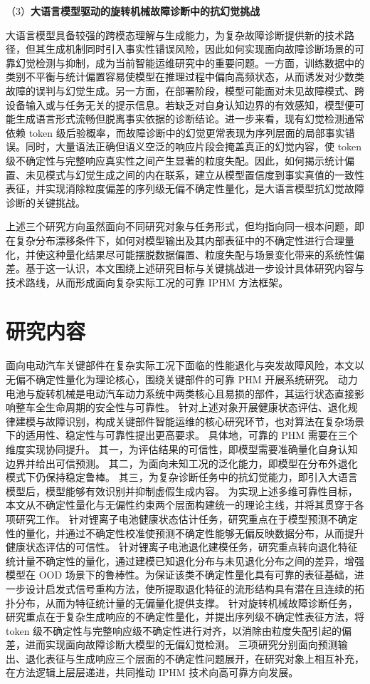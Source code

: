 （3）\textbf{大语言模型驱动的旋转机械故障诊断中的抗幻觉挑战}

大语言模型具备较强的跨模态理解与生成能力，为复杂故障诊断提供新的技术路径，但其生成机制同时引入事实性错误风险，因此如何实现面向故障诊断场景的可靠幻觉检测与抑制，成为当前智能运维研究中的重要问题。一方面，训练数据中的类别不平衡与统计偏置容易使模型在推理过程中偏向高频状态，从而诱发对少数类故障的误判与幻觉生成。另一方面，在部署阶段，模型可能面对未见故障模式、跨设备输入或与任务无关的提示信息。若缺乏对自身认知边界的有效感知，模型便可能生成语言形式流畅但脱离事实依据的诊断结论。进一步来看，现有幻觉检测通常依赖 token 级后验概率，而故障诊断中的幻觉更常表现为序列层面的局部事实错误。同时，大量语法正确但语义空泛的响应片段会掩盖真正的幻觉内容，使 token 级不确定性与完整响应真实性之间产生显著的粒度失配。因此，如何揭示统计偏置、未见模式与幻觉生成之间的内在联系，建立从模型置信度到事实真值的一致性表征，并实现消除粒度偏差的序列级无偏不确定性量化，是大语言模型抗幻觉故障诊断的关键挑战。

上述三个研究方向虽然面向不同研究对象与任务形式，但均指向同一根本问题，即在复杂分布漂移条件下，如何对模型输出及其内部表征中的不确定性进行合理量化，并使这种量化结果尽可能摆脱数据偏置、粒度失配与场景变化带来的系统性偏差。基于这一认识，本文围绕上述研究目标与关键挑战进一步设计具体研究内容与技术路线，从而形成面向复杂实际工况的可靠 IPHM 方法框架。

\section{研究内容}\label{sec:Intro_research_content_and_approach}

面向电动汽车关键部件在复杂实际工况下面临的性能退化与突发故障风险，本文以无偏不确定性量化为理论核心，围绕关键部件的可靠 PHM 开展系统研究。
动力电池与旋转机械是电动汽车动力系统中两类核心且易损的部件，其运行状态直接影响整车全生命周期的安全性与可靠性。
% 
针对上述对象开展健康状态评估、退化规律建模与故障识别，构成关键部件智能运维的核心研究环节，也对算法在复杂场景下的适用性、稳定性与可靠性提出更高要求。
% 
具体地，可靠的 PHM 需要在三个维度实现协同提升。
其一，为评估结果的可信性，即模型需要准确量化自身认知边界并给出可信预测。
其二，为面向未知工况的泛化能力，即模型在分布外退化模式下仍保持稳定鲁棒。
其三，为复杂诊断任务中的抗幻觉能力，即引入大语言模型后，模型能够有效识别并抑制虚假生成内容。
% 
为实现上述多维可靠性目标，本文从不确定性量化与无偏性约束两个层面构建统一的理论主线，并将其贯穿于各项研究工作。
% 
针对锂离子电池健康状态估计任务，研究重点在于模型预测不确定性的量化，并通过不确定性校准使预测不确定性能够无偏反映数据分布，从而提升健康状态评估的可信性。
% 
针对锂离子电池退化建模任务，研究重点转向退化特征统计量不确定性的量化，通过建模已知退化分布与未见退化分布之间的差异，增强模型在 OOD 场景下的鲁棒性。为保证该类不确定性量化具有可靠的表征基础，进一步设计启发式信号重构方法，使所提取退化特征的流形结构具有潜在且连续的拓扑分布，从而为特征统计量的无偏量化提供支撑。
% 
针对旋转机械故障诊断任务，研究重点在于复杂生成响应的不确定性量化，并提出序列级不确定性表征方法，将 token 级不确定性与完整响应级不确定性进行对齐，以消除由粒度失配引起的偏差，进而实现面向故障诊断大模型的无偏幻觉检测。
% 
三项研究分别面向预测输出、退化表征与生成响应三个层面的不确定性问题展开，在研究对象上相互补充，在方法逻辑上层层递进，共同推动 IPHM 技术向高可靠方向发展。

